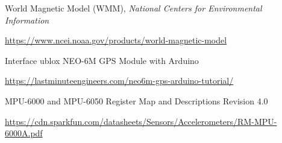 \documentclass[]{article}
\begin{document}
\begin{thebibliography}{9}
	 World Magnetic Model (WMM), \textit{National Centers for Environmental Information}
	
	\url{https://www.ncei.noaa.gov/products/world-magnetic-model}
	
	 Interface ublox NEO-6M GPS Module with Arduino
	
	\url{https://lastminuteengineers.com/neo6m-gps-arduino-tutorial/}
	
	 MPU-6000 and MPU-6050 Register Map and Descriptions Revision 4.0
	
	\url{https://cdn.sparkfun.com/datasheets/Sensors/Accelerometers/RM-MPU-6000A.pdf}
\end{thebibliography}
\end{document}
